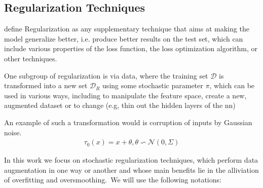 \subsection{Regularization Techniques}
\label{sec:related:pred:regularization}

\citet{Kukacka2017} define Regularization as any supplementary technique that aims at making the
model generalize better, i.e. produce better results on the test set, which can include various
properties of the loss function, the loss optimization algorithm, or other techniques.

One subgroup of regularization is via data, where the training set $\mathcal{D}$ is
transformed into a new set $\mathcal{D}_{R}$ using some stochastic parameter
$\pi$, which can be used in various ways, including to manipulate the feature space,
create a new, augmented dataset or to change (e.g, thin out the hidden layers of
the \ac{nn})

An example of such a transformation would is corruption of inputs by Gaussian noise.
\begin{align}
    \tau_{0}(x) = x + \theta, \theta \backsim \mathcal{N}(0, \Sigma)
\end{align}

In this work we focus on stochastic regularization techniques, which perform
data augmentation in one way or another and whose main benefits lie in the alliviation
of overfitting and oversmoothing\cite{Hasanzadeh2020}.\
We will use the following notations: \

